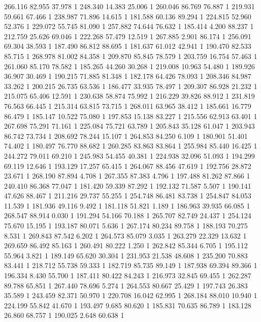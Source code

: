 	266.116	82.955	37.978	1
	248.340	14.383	25.006	1
	260.046	86.769	76.887	1
	219.931	59.661	67.466	1
	238.987	71.896	14.615	1
	181.588	60.136	89.294	1
	224.815	52.960	52.376	1
	229.072	55.745	81.090	1
	257.882	74.644	76.632	1
	185.414	4.200	88.237	1
	212.759	25.626	69.046	1
	222.268	57.479	12.519	1
	267.885	2.901	86.174	1
	256.091	69.304	38.593	1
	187.490	86.812	88.695	1
	181.637	61.012	42.941	1
	190.470	82.533	85.715	1
	268.978	81.002	84.358	1
	209.870	85.845	78.579	1
	203.759	16.754	57.463	1
	261.060	85.170	78.582	1
	185.265	44.260	30.268	1
	219.008	10.963	54.480	1
	189.926	36.907	30.469	1
	190.215	71.885	81.348	1
	182.178	64.426	78.093	1
	208.346	84.987	33.262	1
	200.215	26.735	63.536	1
	186.477	33.935	78.497	1
	209.307	86.928	21.232	1
	215.075	65.406	12.591	1
	230.638	58.874	75.992	1
	216.229	39.826	88.912	1
	231.819	76.563	66.445	1
	215.314	63.815	73.715	1
	268.011	63.965	38.412	1
	185.661	16.779	86.479	1
	185.147	10.522	75.080	1
	197.853	15.138	83.227	1
	215.556	62.913	63.401	1
	267.698	75.291	71.161	1
	225.084	75.721	63.789	1
	205.843	35.128	61.047	1
	203.943	86.742	73.734	1
	208.692	78.244	15.107	1
	264.853	84.250	6.109	1
	180.901	51.401	74.402	1
	180.497	76.770	88.682	1
	260.285	83.863	83.864	1
	255.984	85.440	16.425	1
	244.272	79.011	69.210	1
	245.983	54.455	40.381	1
	224.938	32.096	51.093	1
	194.299	69.119	12.646	1
	193.129	17.257	65.415	1
	264.067	88.456	47.619	1
	192.756	28.872	23.671	1
	268.190	87.894	4.708	1
	267.355	87.383	4.796	1
	197.488	81.262	87.866	1
	240.410	86.368	77.047	1
	181.420	59.339	87.292	1
	192.132	71.587	5.507	1
	190.141	47.626	88.467	1
	211.216	29.737	55.255	1
	254.748	86.481	83.738	1
	254.847	84.053	11.539	1
	181.936	49.116	9.492	1
	181.118	51.821	1.189	1
	186.963	39.935	66.085	1
	268.547	88.914	0.030	1
	191.294	54.166	70.188	1
	265.707	82.749	24.437	1
	254.124	75.670	15.195	1
	193.187	80.071	5.636	1
	267.174	80.234	89.758	1
	188.193	70.275	8.531	1
	269.843	87.542	6.202	1
	264.573	85.079	3.035	1
	263.279	22.329	13.632	1
	269.659	86.492	85.163	1
	260.491	80.222	1.250	1
	262.842	85.344	6.705	1
	195.112	55.964	3.821	1
	189.149	65.620	30.304	1
	231.953	21.538	48.608	1
	235.200	70.883	83.441	1
	218.712	55.738	59.333	1
	182.719	85.735	89.149	1
	187.938	69.394	89.366	1
	196.334	8.430	55.700	1
	187.411	80.422	84.243	1
	216.973	32.845	69.455	1
	262.287	89.788	65.851	1
	267.440	78.696	5.274	1
	264.553	80.667	25.429	1
	197.743	26.383	35.589	1
	243.459	82.371	50.970	1
	220.708	16.042	62.995	1
	268.184	88.010	10.940	1
	224.199	55.842	41.670	1
	193.497	9.685	80.620	1
	185.831	70.635	86.789	1
	183.128	26.860	68.757	1
	190.025	2.648	60.638	1
